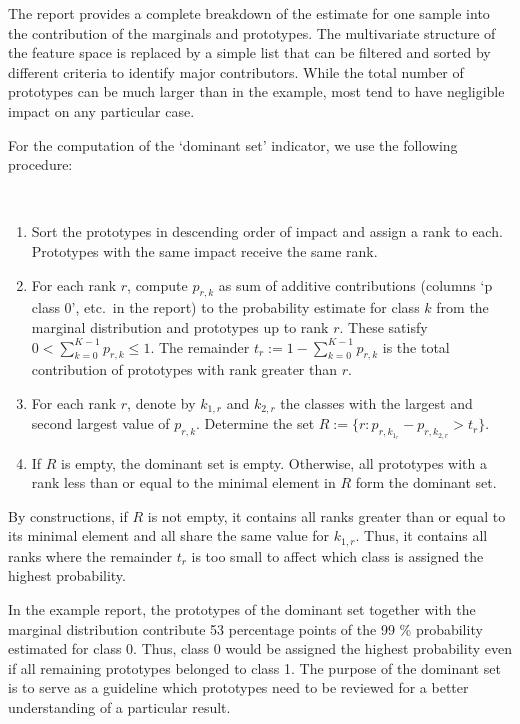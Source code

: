 %
The report provides a complete breakdown of the estimate for one sample into the contribution of the marginals and prototypes.
The multivariate structure of the feature space is replaced by a simple list that can be filtered and sorted by different criteria to identify major contributors.
While the total number of prototypes can be much larger than in the example, most tend to have negligible impact on any particular case.\par
%
For the computation of the `dominant set' indicator, we use the following procedure:
%
\begin{algorithm}~
\label{alg_dominant_set}
%
\begin{enumerate}
\item Sort the prototypes in descending order of impact and assign a rank to each.
Prototypes with the same impact receive the same rank.
%
\item For each rank $r$, compute $p_{r,k}$ as sum of additive contributions (columns `p class 0', etc.\ in the report) to the probability estimate for class $k$ from the marginal distribution and prototypes up to rank $r$.
These satisfy $0<\sum_{k=0}^{K-1}p_{r,k}\leq 1$.
The remainder $t_r:=1-\sum_{k=0}^{K-1}p_{r,k}$ is the total contribution of prototypes with rank greater than $r$.
%
\item For each rank $r$, denote by $k_{1,r}$ and $k_{2,r}$ the classes with the largest and second largest value of $p_{r,k}$.
Determine the set  $R:=\{r:p_{r,k_{1_r}}-p_{r,k_{2,r}}>t_r\}$.
%
\item If $R$ is empty, the dominant set is empty.
Otherwise, all prototypes with a rank less than or equal to the minimal element in $R$ form the dominant set.
\end{enumerate}
\end{algorithm}
%
\begin{remark}
By constructions, if $R$ is not empty, it contains all ranks greater than or equal to its minimal element and all share the same value for $k_{1,r}$.
Thus, it contains all ranks where the remainder $t_r$ is too small to affect which class is assigned the highest probability.
\end{remark}
%
In the example report, the prototypes of the dominant set together with the marginal distribution contribute 53 percentage points of the 99 \% probability estimated for class 0.
Thus, class 0 would be assigned the highest probability even if all remaining prototypes belonged to class 1.
The purpose of the dominant set is to serve as a guideline which prototypes need to be reviewed for a better understanding of a particular result.\par
